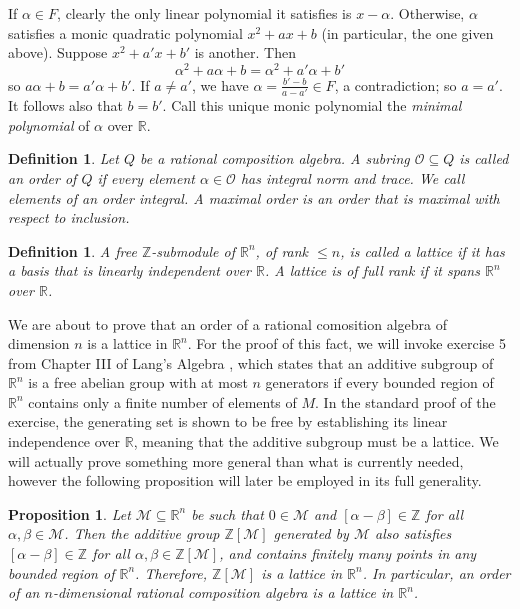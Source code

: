 \documentclass[10pt]{amsart}
\newcommand{\M}{\mathcal{M}}
\newcommand{\Z}{\mathbb{Z}}
\newcommand{\R}{\mathbb{R}}
\newcommand{\Ord}{\mathcal{O}}
\newcommand{\norm}[1]{\left[#1\right]}
\newtheorem{defn}[thm]{Definition}
\newtheorem{prop}[thm]{Proposition}
\begin{document}
If $\alpha \in F$, clearly the only linear polynomial it satisfies is $x - \alpha$.  Otherwise, $\alpha$ satisfies a monic quadratic polynomial $x^2 + ax + b$ (in particular, the one given above).  Suppose $x^2 + a'x + b'$ is another.  Then
$$
\alpha^2 + a\alpha + b = \alpha^2 + a'\alpha + b'
$$
so $a\alpha + b = a' \alpha + b'$.  If $a \neq a'$, we have $\alpha = \frac{b'-b}{a-a'} \in F$, a contradiction; so $a = a'$.  It follows also that $b = b'$.  Call this unique monic polynomial the \emph{minimal polynomial} of $\alpha$ over $\R$.

\begin{defn}
\normalfont
Let $Q$ be a rational composition algebra.  A subring $\Ord \subseteq Q$ is called an \emph{order} of $Q$ if every element $\alpha \in \Ord$ has integral norm and trace.  We call elements of an order \emph{integral}.  A \emph{maximal order} is an order that is maximal with respect to inclusion.
\end{defn}

\begin{defn}
\normalfont
A free $\Z$-submodule of $\R^n$, of rank $\leq n$, is called a \emph{lattice} if it has a basis that is linearly independent over $\R$.  A lattice is of \emph{full rank} if it spans $\R^n$ over $\R$.
\end{defn}

We are about to prove that an order of a rational comosition algebra of dimension $n$ is a lattice in $\R^n$.  For the proof of this fact, we will invoke exercise 5 from Chapter III of Lang's Algebra \cite{Lang}, which states that an additive subgroup of $\R^n$ is a free abelian group with at most $n$ generators if every bounded region of $\R^n$ contains only a finite number of elements of $M$.  In the standard proof of the exercise, the generating set is shown to be free by establishing its linear independence over $\R$, meaning that the additive subgroup must be a lattice.  We will actually prove something more general than what is currently needed, however the following proposition will later be employed in its full generality.

\begin{prop} \label{prop:finite}
\normalfont
Let $\M \subseteq \R^n$ be such that $0 \in \M$ and $\norm{\alpha - \beta} \in \Z$ for all $\alpha, \beta \in \M$.  Then the additive group $\Z[\M]$ generated by $\M$ also satisfies $\norm{\alpha - \beta} \in \Z$ for all $\alpha,\beta \in \Z[\M]$, and contains finitely many points in any bounded region of $\R^n$.  Therefore, $\Z[\M]$ is a lattice in $\R^n$.  In particular, an order of an $n$-dimensional rational composition algebra is a lattice in $\R^n$.
\end{prop}
\end{document}
